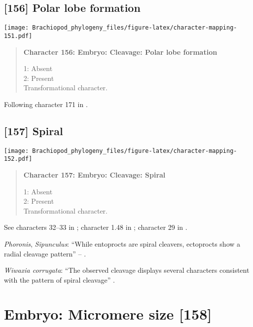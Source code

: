 \documentclass[openany]{book}
\theoremstyle{definition}
\theoremstyle{definition}
\theoremstyle{definition}
\theoremstyle{remark}
\begin{document}
\subsection*{{[}156{]} Polar lobe formation}\label{polar-lobe-formation}

\texttt{[image: Brachiopod\_phylogeny\_files/figure-latex/character-mapping-151.pdf]}

\begin{quote}
\textbf{Character 156: Embryo: Cleavage: Polar lobe formation}

1: Absent\\
2: Present\\
Transformational character.
\end{quote}

Following character 171 in \citet{Giribet2002}.

\subsection*{{[}157{]} Spiral}\label{spiral}

\texttt{[image: Brachiopod\_phylogeny\_files/figure-latex/character-mapping-152.pdf]}

\begin{quote}
\textbf{Character 157: Embryo: Cleavage: Spiral}

1: Absent\\
2: Present\\
Transformational character.
\end{quote}

See characters 32--33 in \citet{Haszprunar1996}; character 1.48 in
\citet{SPS1996}; character 29 in \citet{Glenner2004}.

\hypertarget{Phoronis-coding-157}{}
\emph{Phoronis}, \emph{Sipunculus}: ``While entoprocts are spiral
cleavers, ectoprocts show a radial cleavage pattern'' --
\citet{Fuchs2008}.

\hypertarget{Wiwaxia_corrugata-coding-157}{}
\emph{Wiwaxia corrugata}: ``The observed cleavage displays several
characters consistent with the pattern of spiral cleavage''
\citep{Pennerstorfer2012}.

\section{Embryo: Micromere size
{[}158{]}}\label{embryo-micromere-size-158}
\end{document}
